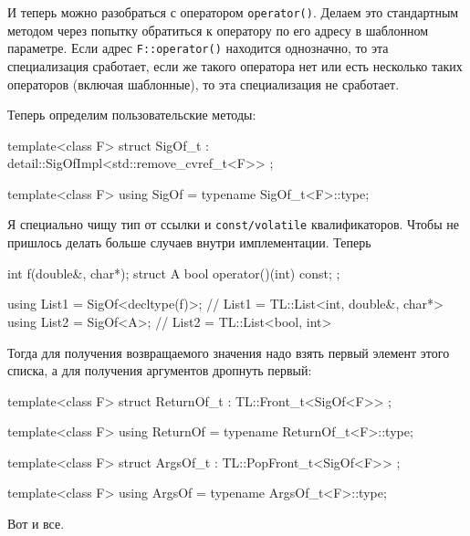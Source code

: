 И теперь можно разобраться с оператором \verb"operator()".
Делаем это стандартным методом через попытку обратиться к оператору по его адресу в шаблонном параметре.
Если адрес \verb"F::operator()" находится однозначно, то эта специализация сработает, если же такого оператора нет или есть несколько таких операторов (включая шаблонные), то эта специализация не сработает.
\begin{cppcode}
template<class F>
struct SigOfImpl<F, ForgetV<&F::operator()>> {
  using type = typename SigOfImpl<decltype(&F::operator())>::type;
};
} // namespace detail
\end{cppcode}
Теперь определим пользовательские методы:
\begin{cppcode}
template<class F>
struct SigOf_t : detail::SigOfImpl<std::remove_cvref_t<F>> {};

template<class F>
using SigOf = typename SigOf_t<F>::type;
\end{cppcode}
Я специально чищу тип от ссылки и \verb"const/volatile" квалификаторов.
Чтобы не пришлось делать больше случаев внутри имплементации.
Теперь 
\begin{cppcode}
int f(double&, char*);
struct A {
  bool operator()(int) const;
};

using List1 = SigOf<decltype(f)>;
// List1 = TL::List<int, double&, char*>
using List2 = SigOf<A>;
// List2 = TL::List<bool, int>
\end{cppcode}
Тогда для получения возвращаемого значения надо взять первый элемент этого списка, а для получения аргументов дропнуть первый:
\begin{cppcode}
template<class F>
struct ReturnOf_t : TL::Front_t<SigOf<F>> {};

template<class F>
using ReturnOf = typename ReturnOf_t<F>::type;

template<class F>
struct ArgsOf_t : TL::PopFront_t<SigOf<F>> {};

template<class F>
using ArgsOf = typename ArgsOf_t<F>::type;
\end{cppcode}
Вот и все.
